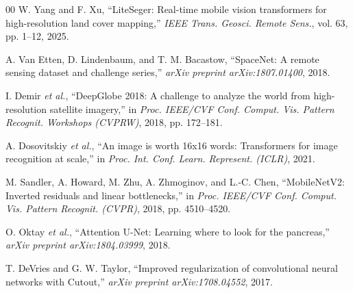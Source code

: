 \documentclass[conference]{IEEEtran}
\begin{document}
\begin{thebibliography}{00}
 W. Yang and F. Xu, ``LiteSeger: Real-time mobile vision transformers for high-resolution land cover mapping,'' \textit{IEEE Trans. Geosci. Remote Sens.}, vol. 63, pp. 1--12, 2025.

 A. Van Etten, D. Lindenbaum, and T. M. Bacastow, ``SpaceNet: A remote sensing dataset and challenge series,'' \textit{arXiv preprint arXiv:1807.01400}, 2018.

 I. Demir \textit{et al.}, ``DeepGlobe 2018: A challenge to analyze the world from high-resolution satellite imagery,'' in \textit{Proc. IEEE/CVF Conf. Comput. Vis. Pattern Recognit. Workshops (CVPRW)}, 2018, pp. 172--181.

 A. Dosovitskiy \textit{et al.}, ``An image is worth 16x16 words: Transformers for image recognition at scale,'' in \textit{Proc. Int. Conf. Learn. Represent. (ICLR)}, 2021.

 M. Sandler, A. Howard, M. Zhu, A. Zhmoginov, and L.-C. Chen, ``MobileNetV2: Inverted residuals and linear bottlenecks,'' in \textit{Proc. IEEE/CVF Conf. Comput. Vis. Pattern Recognit. (CVPR)}, 2018, pp. 4510--4520.

 O. Oktay \textit{et al.}, ``Attention U-Net: Learning where to look for the pancreas,'' \textit{arXiv preprint arXiv:1804.03999}, 2018.

 T. DeVries and G. W. Taylor, ``Improved regularization of convolutional neural networks with Cutout,'' \textit{arXiv preprint arXiv:1708.04552}, 2017.

\end{thebibliography}
\end{document}
